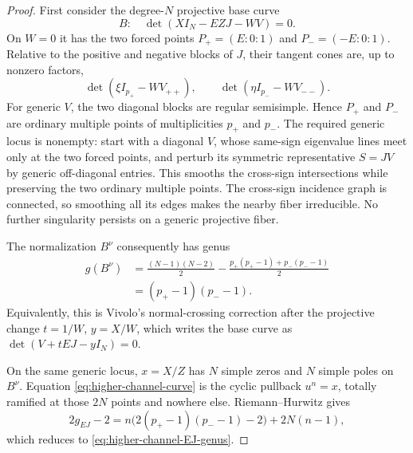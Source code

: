 \documentclass[10pt,a4paper]{amsart}
\begin{document}
\begin{proof}
First consider the degree-$N$ projective base curve
\[
 B:\quad \det(XI_N-EZJ-WV)=0.
\]
On $W=0$ it has the two forced points
$P_+=(E:0:1)$ and $P_-=(-E:0:1)$.  Relative to the positive and negative
blocks of $J$, their tangent cones are, up to nonzero factors,
\[
 \det(\xi I_{p_+}-WV_{++}),\qquad
 \det(\eta I_{p_-}-WV_{--}).
\]
For generic $V$, the two diagonal blocks are regular semisimple.  Hence
$P_+$ and $P_-$ are ordinary multiple points of multiplicities $p_+$ and
$p_-$.  The required generic locus is nonempty: start with a diagonal
$V$, whose same-sign eigenvalue lines meet only at the two forced points,
and perturb its symmetric representative $S=JV$ by generic off-diagonal
entries.  This smooths the cross-sign intersections while preserving the
two ordinary multiple points.  The cross-sign incidence graph is connected,
so smoothing all its edges makes the nearby fiber irreducible.  No further
singularity persists on a generic projective fiber.

The normalization $B^\nu$ consequently has genus
\begin{align*}
 g(B^\nu)
 &=\frac{(N-1)(N-2)}2
   -\frac{p_+(p_+-1)+p_-(p_--1)}2 \\
 &=(p_+-1)(p_--1).
\end{align*}
Equivalently, this is Vivolo's normal-crossing correction after the
projective change $t=1/W$, $y=X/W$, which writes the base curve as
$\det(V+tEJ-yI_N)=0$.

On the same generic locus, $x=X/Z$ has $N$ simple zeros and $N$ simple
poles on $B^\nu$.  Equation \eqref{eq:higher-channel-curve} is the
cyclic pullback $u^n=x$, totally ramified at those $2N$ points and nowhere
else.  Riemann--Hurwitz gives
\[
 2g_{EJ}-2
 =n\bigl(2(p_+-1)(p_--1)-2\bigr)+2N(n-1),
\]
which reduces to \eqref{eq:higher-channel-EJ-genus}.
\end{proof}
\end{document}
